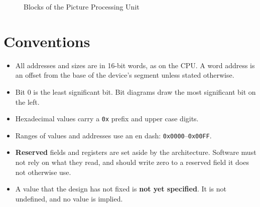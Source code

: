 \begin{figure}[H]
	\caption{Blocks of the Picture Processing Unit}
	\label{fig:block-ppu}
\end{figure}

\section{Conventions}

\begin{itemize}
	\item All addresses and sizes are in 16-bit words, as on the CPU. A word address is an offset from the base of the device's
	      segment unless stated otherwise.
	\item Bit 0 is the least significant bit. Bit diagrams draw the most significant bit on the left.
	\item Hexadecimal values carry a \texttt{0x} prefix and upper case digits.
	\item Ranges of values and addresses use an en dash: \texttt{0x0000}--\texttt{0x00FF}.
	\item \textbf{Reserved} fields and registers are set aside by the architecture. Software must not rely on what they
	      read, and should write zero to a reserved field it does not otherwise use.
	\item A value that the design has not fixed is \textbf{not yet specified}. It is not undefined, and no value is implied.
\end{itemize}
